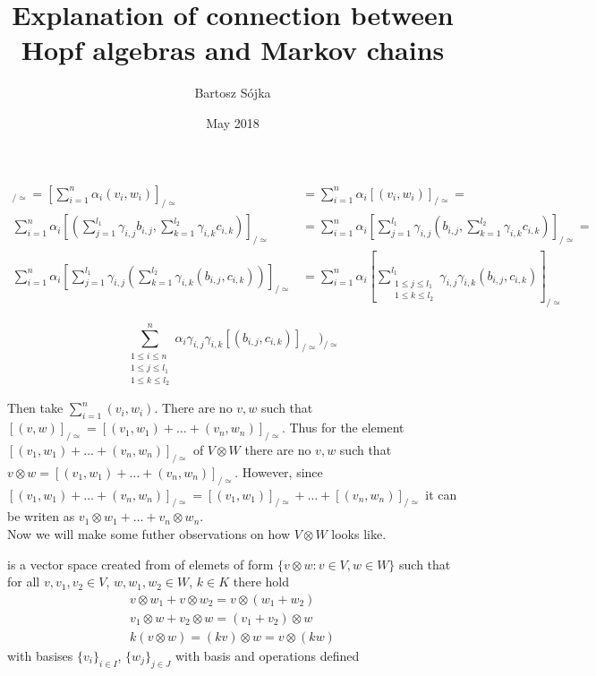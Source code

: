 \documentclass[a4paper]{article}
\title{Explanation of connection between Hopf algebras and Markov chains}
\author{Bartosz Sójka}
\date{May 2018}
\begin{document}
\begin{align}
[z]_{/\simeq} = \left[\sum^n_{i = 1}\alpha_i(v_i,w_i)\right]_{/\simeq} &=
\displaystyle\sum^n_{i = 1}\alpha_i[(v_i,w_i)]_{/\simeq} = \\
\displaystyle\sum^n_{i = 1}\alpha_i\left[\left(\sum^{l_1}_{j=1}\gamma_{i,j}b_{i,j},
\sum^{l_2}_{k=1}\gamma_{i,k}c_{i,k}\right)\right]_{/\simeq} &=
\displaystyle\sum^n_{i = 1}\alpha_i\left[\sum^{l_1}_{j=1}\gamma_{i,j}\left(b_{i,j},
\sum^{l_2}_{k=1}\gamma_{i,k}c_{i,k}\right)\right]_{/\simeq} = \\
\displaystyle\sum^n_{i = 1}\alpha_i\left[\sum^{l_1}_{j=1}\gamma_{i,j}\left(\sum^{l_2}_{k=1}\gamma_{i,k}
\left(b_{i,j},c_{i,k}\right)\right)\right]_{/\simeq} &=
\displaystyle\sum^n_{i = 1}\alpha_i\left[\sum^{l_1}_{\substack{1 \leq j \leq l_1 \\ 1 \leq k \leq l_2}}
\gamma_{i,j}\gamma_{i,k}(b_{i,j}, c_{i,k})\right]_{/\simeq}
\end{align}

\begin{equation}
\sum^n_{\substack{1 \leq i \leq n \\1 \leq j \leq l_1 \\ 1 \leq k \leq l_2}}
\alpha_i\gamma_{i,j}\gamma_{i,k}[(b_{i,j}, c_{i,k})]_{/\simeq})_{/\simeq}
\end{equation}

Then take $\displaystyle\sum^n_{i=1}(v_i,w_i)$. There are no $v, w$
such that $ [(v,w)]_{/\simeq} = [(v_1,w_1) +\dots + (v_n,w_n)]_{/\simeq}$.
Thus for the element $[(v_1,w_1) + \dots + (v_n,w_n)]_{/\simeq}$ of $V\otimes W$ there are no $v, w$
such that $v \otimes w = [(v_1,w_1) + \dots + (v_n,w_n)]_{/\simeq}$. However, since
$[(v_1,w_1) + \dots + (v_n,w_n)]_{/\simeq} = [(v_1,w_1)]_{/\simeq} + \dots + [(v_n,w_n)]_{/\simeq}$
it can be writen as $v_1 \otimes w_1 + \dots + v_n \otimes w_n$. \\
Now we will make some futher observations on how $V \otimes W$ looks like.


 is a vector space created from
 of elemets of form $\{v \otimes w : v \in V, w \in W\}$
such that for all $v,v_1,v_2 \in V$, $w, w_1, w_2 \in W$, $k \in K$ there hold
\begin{gather*}
v \otimes w_1 + v \otimes w_2 = v \otimes (w_1 + w_2) \\
v_1 \otimes w + v_2 \otimes w = (v_1 + v_2) \otimes w \\
k (v \otimes w) = (kv) \otimes w = v \otimes (kw)
\end{gather*}
with basises $\{v_i\}_{i \in I}$, $\{w_j\}_{j \in J}$
with basis and operations defined
\end{document}
